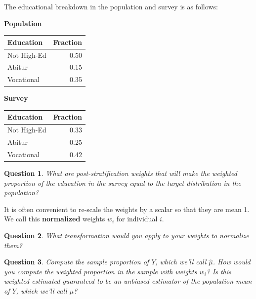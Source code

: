 \documentclass[10pt, letterpaper]{article}
\theoremstyle{mytheoremstyle}
\newtheorem{question}{Question}[section]
\begin{document}
The educational breakdown in the population and survey is as follows:

\bigskip

\begin{minipage}{0.5\linewidth}

\begin{center}
\textbf{Population}


\begin{tabular}[t]{lr}
\toprule
Education & Fraction\\
\midrule
Not High-Ed & 0.50\\
Abitur & 0.15\\
Vocational & 0.35\\
\bottomrule
\end{tabular}
\end{center}
\end{minipage} %
\begin{minipage}{0.25\linewidth}
\begin{center}
\textbf{Survey}

\begin{tabular}[t]{lr}
\toprule
Education & Fraction\\
\midrule
Not High-Ed & 0.33\\
Abitur & 0.25\\
Vocational & 0.42\\
\bottomrule
\end{tabular}
\end{center}
\end{minipage}


\begin{question}
What are post-stratification weights that will make the weighted proportion of the education in the survey equal to the target distribution in the population? 
\end{question}

It is often convenient to re-scale the weights by a scalar so that they are mean 1. We call this \textbf{normalized} weights $w_i$ for individual $i$. 

\begin{question}
What transformation would you apply to your weights to normalize them?  
\end{question}
\vspace{1in}

\begin{question}
Compute the sample proportion of $Y$, which we'll call $\widehat{\mu}$. How would you compute the weighted proportion in the sample with weights $w_i$? Is this weighted estimated guaranteed to be an unbiased estimator of the population mean of $Y$, which we'll call $\mu$?
\end{question}
\end{document}

